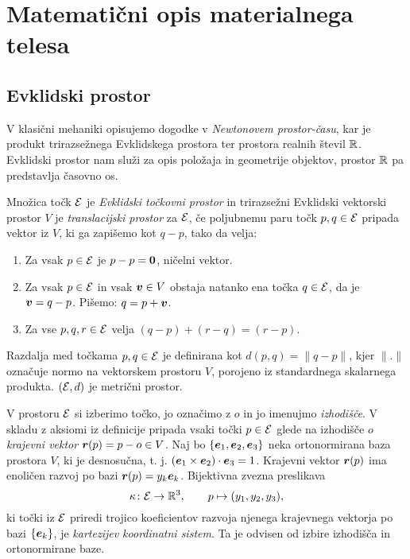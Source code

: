 \chapter{Matematični opis materialnega telesa}


\section{Evklidski prostor}


V klasični mehaniki opisujemo dogodke v \emph{Newtonovem prostor-času}, kar je produkt
trirazsežnega Evklidskega prostora ter prostora realnih števil $\mathbb R$. Evklidski prostor nam služi
za opis položaja in geometrije objektov, prostor $\mathbb R$ pa predstavlja časovno os.

\begin{definicija} \label{d:ep}
	Množica točk $\mathcal E$ je \emph{Evklidski točkovni prostor} in trirazsežni Evklidski vektorski prostor $V$ je
	\emph{translacijski prostor} za $\mathcal E$, če poljubnemu paru točk $p,q\in\mathcal E$ pripada vektor iz $V$,
	ki ga zapišemo kot $q-p$, tako da velja:
	\begin{enumerate}
		\item Za vsak $p\in\mathcal E$ je $p-p=\boldsymbol 0$, ničelni vektor.
		\item Za vsak $p\in\mathcal E$ in vsak $\boldsymbol v\in V$ obstaja natanko ena točka $q\in\mathcal E$, da je
		$\boldsymbol v=q-p$. Pišemo: $q=p+\boldsymbol v$.
		\item Za vse $p,q,r\in\mathcal E$ velja $(q-p)+(r-q)=(r-p)$.
	\end{enumerate}
\end{definicija}

Razdalja med točkama $p,q\in\mathcal E$ je definirana kot $d(p,q)=\|q-p\|$, kjer $\|.\|$ označuje normo na
vektorskem prostoru $V$, porojeno iz standardnega skalarnega produkta. $(\mathcal E,d)$ je metrični prostor.

V prostoru $\mathcal E$ si izberimo točko, jo označimo z $o$ in jo imenujmo \emph{izhodišče}.
V skladu z aksiomi iz definicije pripada vsaki točki $p\in\mathcal E$ glede na izhodišče $o$ \emph{krajevni vektor}
$\boldsymbol r(p)=p-o\in V$. Naj bo $\{\boldsymbol e_1,\boldsymbol e_2,\boldsymbol e_3\}$ neka ortonormirana baza prostora $V$,
ki je desnosučna, t. j. $(\boldsymbol e_1\times\boldsymbol e_2)\cdot\boldsymbol e_3=1$. Krajevni vektor $\boldsymbol r(p)$
ima enoličen razvoj po bazi $\boldsymbol r(p)=y_k\boldsymbol e_k$. Bijektivna zvezna preslikava
\begin{equation*}
	\kappa\colon\mathcal E\to\mathbb R^3,\qquad p\mapsto (y_1,y_2,y_3),
\end{equation*}
ki točki iz $\mathcal E$ priredi trojico koeficientov razvoja njenega krajevnega vektorja po bazi $\{\boldsymbol e_k\}$, je
\emph{kartezijev koordinatni sistem}. Ta je odvisen od izbire izhodišča in ortonormirane baze.

